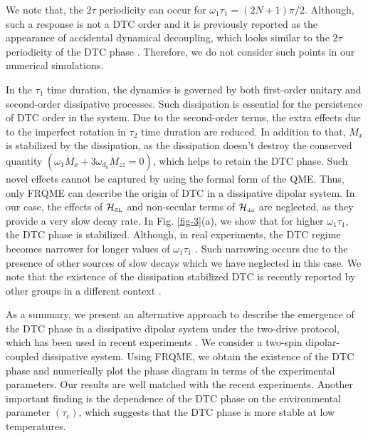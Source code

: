 \documentclass[prl,aps,preprint,floatfix]{revtex4-2}
\newcommand{\hsl}{\mathcal{H}_{\scriptscriptstyle \rm SL}}
\newcommand{\hdd}{\mathcal{H}_{\scriptscriptstyle \rm dd}}
\begin{document}
We note that, the $2\tau$ periodicity can occur for $\omega_1\tau_1 = (2N +1)\pi/2$. Although, such a response is not a DTC order and it is previously reported as the appearance of accidental dynamical decoupling, which looks similar to the $2\tau$ periodicity of the DTC phase \cite{choi_observation_2017}. Therefore, we do not consider such points in our numerical simulations.

In the $\tau_1$ time duration, the dynamics is governed by both first-order unitary and second-order dissipative processes. Such dissipation is essential for the persistence of DTC order in the system. Due to the second-order terms, the extra effects due to the imperfect rotation in $\tau_2$ time duration are reduced. In addition to that, $M_x$ is stabilized by the dissipation,  as the dissipation doesn't destroy the conserved quantity  $(\omega_1\dot{M}_x + 3 \omega_{d_0}\dot{M}_{zz}  = 0)$,  which helps to retain the DTC phase. Such novel effects cannot be captured by using the formal form of the QME. Thus, only FRQME can describe the origin of DTC in a dissipative dipolar system. In our case, the effects of $\hsl$ and non-secular terms of $\hdd$ are neglected, as they provide a very slow decay rate. In Fig. \ref{fig-3}(a),  we show that for higher $\omega_1 \tau_1$, the DTC phase is stabilized. Although, in real experiments, the DTC regime becomes narrower for longer values of $\omega_1 \tau_1$ \cite{choi_observation_2017,ho_critical_2017}. Such narrowing occurs due to the presence of other sources of slow decays which we have neglected in this case. We note that the existence of the dissipation stabilized DTC is recently reported by other groups in a different context \cite{lazarides_time_2020}.



As a summary, we present an alternative approach to describe the emergence of the DTC phase in a dissipative dipolar system under the two-drive protocol, which has been used in recent experiments \cite{choi_observation_2017,beatrez_critical_2023}. We consider a two-spin dipolar-coupled dissipative system. Using FRQME, we obtain the existence of the DTC phase and numerically plot the phase diagram in terms of the experimental parameters. Our results are well matched with the recent experiments\cite{choi_observation_2017,beatrez_critical_2023}. Another important finding is the dependence of the DTC phase on the environmental parameter $(\tau_c)$, which suggests that the DTC phase is more stable at low temperatures.
\end{document}
